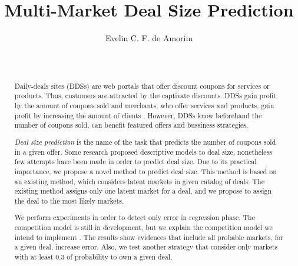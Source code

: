 \documentclass{acm_proc_article-sp}
\begin{document}
\title{Multi-Market Deal Size Prediction}


%
\author{
\alignauthor
Evelin C. F. de Amorim \\
       \\
       \\
}

\maketitle
\begin{abstract}

Daily-deals sites (DDSs) are web portals that offer discount coupons for services 
or products. Thus, customers are attracted by the captivate discounts. 
DDSs gain profit by the amount of coupons sold and  merchants, who offer  
services and products, gain profit by increasing the amount of clients 
. However, DDSs know 
beforehand the number of coupons sold, can benefit featured offers and 
bussiness strategies.

\emph{Deal size prediction} is the name of the task that predicts the number 
of coupons sold in a given offer. Some research proposed descriptive models 
to deal size, nonetheless few attempts have been made in order to 
predict deal size. Due to its practical importance, we propose a 
novel method to predict deal size. This method is based on an existing method, 
which considers latent markets in given catalog of deals. The existing method 
assigns only one latent market for a deal, and we propose to 
assign the deal to the most likely markets.

We perform experiments in order to detect 
only error in regression phase. The competition model is still in 
development, but we explain the competition model we intend to 
implement
. The results show evidences that 
include all probable markets,  
for a given deal, increase error. Also, we test another strategy that 
consider only markets with at least 0.3 of probability to own a given deal.

\end{abstract}

\end{document}
